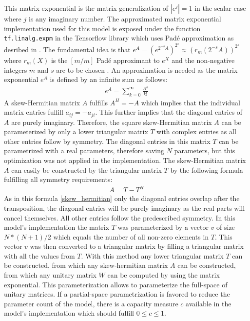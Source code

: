 \documentclass[draft,final]{vutinfth} %
\begin{document}
    This matrix exponential is the matrix generalization of $|e^j|=1$ in the scalar case where $j$ is any imaginary number.
    The approximated matrix exponential implementation used for this model is exposed under the function \texttt{tf.linalg.expm} in the Tensorflow library \cite{Tensorflow} which uses Padé approximation as desribed in \cite{expm}.
    The fundamental idea is that $e^A = (e^{2^{-s}A})^{2^s} \approx (r_m(2^{-s}A))^{2^s}$ where $r_m(X)$ is the $[m/m]$ Padé approximant to $e^X$ and the non-negative integers $m$ and $s$ are to be chosen \cite[p. 1]{expm}.
    An approximation is needed as the matrix exponential $e^A$ is defined by an infinite sum as follows:
    \begin{align}
    \label{expm_definition}
    e^A = \sum_{k=0}^{\infty} \frac{A^k}{k!}
    \end{align}
    A skew-Hermitian matrix $A$ fulfills $A^H = -A$ which implies that the individual matrix entries fulfill $a_{ij} = -\overline{a_{ji}}$. 
    This further implies that the diagonal entries of $A$ are purely imaginary.
    Therefore, the square skew-Hermitian matrix $A$ can be parameterized by only a lower triangular matrix $T$ with complex entries as all other entries follow by symmetry.
    The diagonal entries in this matrix $T$ can be parametrized with a real parameters, therefore saving $N$ parameters, but this optimization was not applied in the implementation.
    The skew-Hermitian matrix $A$ can easily be constructed by the triangular matrix $T$ by the following formula fulfilling all symmetry requirements:
    \begin{align}
    \label{skew_hermitian}
    A = T - T^H
    \end{align}
    As in this formula \ref{skew_hermitian} only the diagonal entries overlap after the transposition, the diagonal entries will be purely imaginary as the real parts will cancel themselves.
    All other entries follow the predescribed symmetry.
    In this model's implementation the matrix $T$ was parameterized by a vector $v$ of size $N*(N+1)/2$ which equals the number of all non-zero elements in $T$.
    This vector $v$ was then converted to a triangular matrix by filling a triangular matrix with all the values from $T$.
    With this method any lower triangular matrix $T$ can be constructed, from which any skew-hermitian matrix $A$ can be constructed, from which any unitary matrix $W$ can be computed by using the matrix exponential.
    This parameterization allows to parameterize the full-space of unitary matrices. 
    If a partial-space parametrization is favored to reduce the parameter count of the model, there is a capacity measure $c$ available in the model's implementation which should fulfill $0 \leq c \leq 1$.
\end{document}
